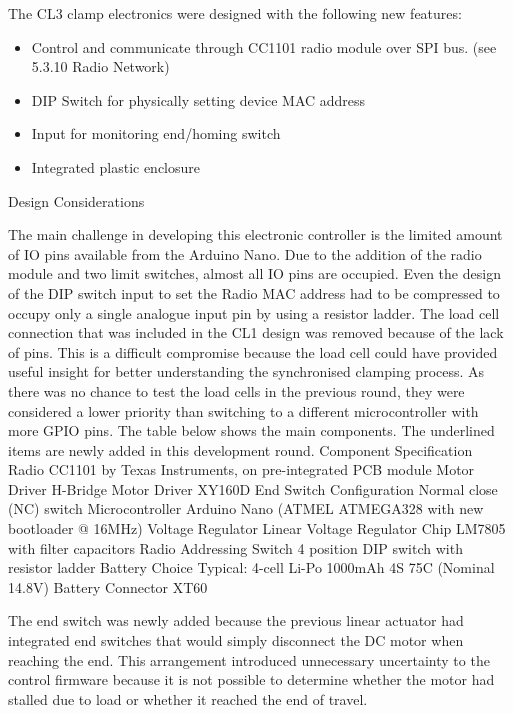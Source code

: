 The CL3 clamp electronics were designed with the following new features:
\begin{itemize}
    \item Control and communicate through CC1101 radio module over SPI bus. (see 5.3.10 Radio Network)
    \item DIP Switch for physically setting device MAC address
    \item Input for monitoring end/homing switch
    \item Integrated plastic enclosure
\end{itemize}

Design Considerations

The main challenge in developing this electronic controller is the limited amount of IO pins available from the Arduino Nano. Due to the addition of the radio module and two limit switches, almost all IO pins are occupied. Even the design of the DIP switch input to set the Radio MAC address had to be compressed to occupy only a single analogue input pin by using a resistor ladder. \parencite{chrisPerfectMultibuttonInput2018}
The load cell connection that was included in the CL1 design was removed because of the lack of pins. This is a difficult compromise because the load cell could have provided useful insight for better understanding the synchronised clamping process. As there was no chance to test the load cells in the previous round, they were considered a lower priority than switching to a different microcontroller with more GPIO pins.  
The table below shows the main components. The underlined items are newly added in this development round. 
Component
Specification
Radio
CC1101 by Texas Instruments, on pre-integrated PCB module
Motor Driver
H-Bridge Motor Driver XY160D
End Switch Configuration
Normal close (NC) switch
Microcontroller
Arduino Nano (ATMEL ATMEGA328 with new bootloader @ 16MHz)
Voltage Regulator
 Linear Voltage Regulator Chip LM7805 with filter capacitors
Radio Addressing Switch
 4 position DIP switch with resistor ladder
Battery Choice
Typical: 4-cell Li-Po 1000mAh 4S 75C (Nominal 14.8V)
Battery Connector
XT60 


The end switch was newly added because the previous linear actuator had integrated end switches that would simply disconnect the DC motor when reaching the end. This arrangement introduced unnecessary uncertainty to the control firmware because it is not possible to determine whether the motor had stalled due to load or whether it reached the end of travel.

